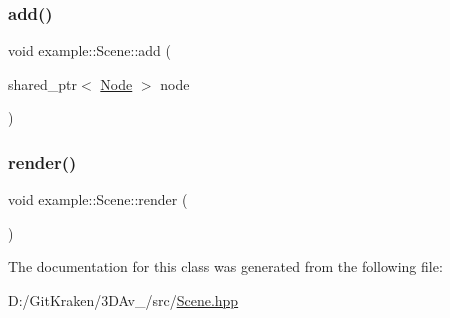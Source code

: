 \subsubsection{\texorpdfstring{add()}{add()}}
{\footnotesize\ttfamily void example\+::\+Scene\+::add (\begin{DoxyParamCaption}\item[{shared\+\_\+ptr$<$ \mbox{\hyperlink{classexample_1_1_node}{Node}} $>$}]{node }\end{DoxyParamCaption})\hspace{0.3cm}{\ttfamily [inline]}}

\mbox{\label{classexample_1_1_scene_a6e8672b9fab7eaa38bc039467dc0b66a}} 
\subsubsection{\texorpdfstring{render()}{render()}}
{\footnotesize\ttfamily void example\+::\+Scene\+::render (\begin{DoxyParamCaption}{ }\end{DoxyParamCaption})\hspace{0.3cm}{\ttfamily [inline]}}



The documentation for this class was generated from the following file\+:\begin{DoxyCompactItemize}
\item 
D\+:/\+Git\+Kraken/3\+D\+Av\+\_/src/\mbox{\hyperlink{_scene_8hpp}{Scene.\+hpp}}\end{DoxyCompactItemize}
